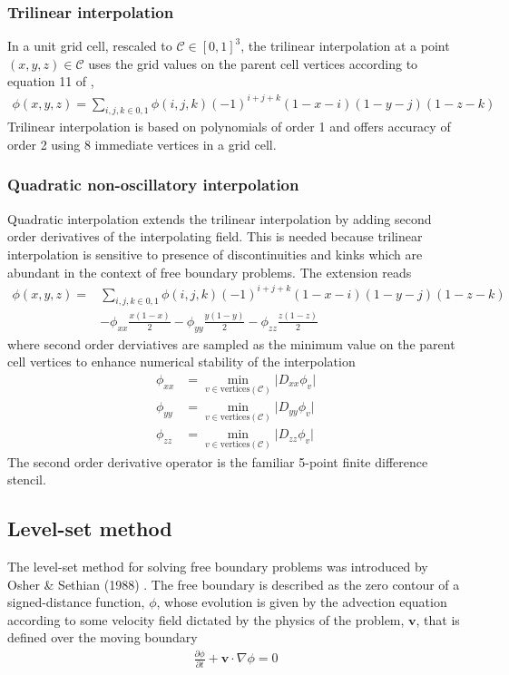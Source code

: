 \documentclass{elsarticle}
\begin{document}
\subsubsection{Trilinear interpolation}
In a unit grid cell, rescaled to $\mathcal{C}\in [0,1]^3$, the trilinear interpolation at a point $(x,y,z)\in \mathcal{C}$ uses the grid values on the parent cell vertices according to equation 11 of \cite{MIN2007300},
\begin{align*}
 \phi(x,y,z)= \sum_{i,j,k\in {0,1}} \phi(i,j,k) (-1)^{i+j+k}(1-x-i)(1-y-j)(1-z-k)
\end{align*}
Trilinear interpolation is based on polynomials of order 1 and offers accuracy of order 2 using 8 immediate vertices in a grid cell.

\subsubsection{Quadratic non-oscillatory interpolation}
Quadratic interpolation extends the trilinear interpolation by adding second order derivatives of the interpolating field. This is needed because trilinear interpolation is sensitive to presence of discontinuities and kinks which are abundant in the context of free boundary problems. The extension reads
\begin{align*}
	\phi(x,y,z)= &\sum_{i,j,k\in {0,1}} \phi(i,j,k) (-1)^{i+j+k}(1-x-i)(1-y-j)(1-z-k) \\
				& - \phi_{xx} \frac{x(1-x)}{2} - \phi_{yy} \frac{y(1-y)}{2}- \phi_{zz} \frac{z(1-z)}{2} 
\end{align*}
where second order derviatives are sampled as the minimum value on the parent cell vertices to enhance numerical stability of the interpolation
\begin{align*}
	\phi_{xx} & = \min_{v \in \textrm{vertices}(\mathcal{C})} \vert D_{xx} \phi_v \vert \\
	\phi_{yy} & = \min_{v \in \textrm{vertices}(\mathcal{C})} \vert D_{yy} \phi_v \vert \\
	\phi_{zz} & = \min_{v \in \textrm{vertices}(\mathcal{C})} \vert D_{zz} \phi_v \vert
\end{align*}
The second order derivative operator is the familiar 5-point finite difference stencil.




\subsection{Level-set method}
The level-set method for solving free boundary problems was introduced by Osher \& Sethian (1988) \cite{osher1988fronts}. The free boundary is described as the zero contour of a signed-distance function, $\phi$, whose evolution is given by the advection equation according to some velocity field dictated by the physics of the problem, $\mathbf{v}$, that is defined over the moving boundary
\begin{align}
	\frac{\partial \phi}{\partial t} + \mathbf{v}\cdot \nabla \phi = 0
\end{align}
\end{document}
